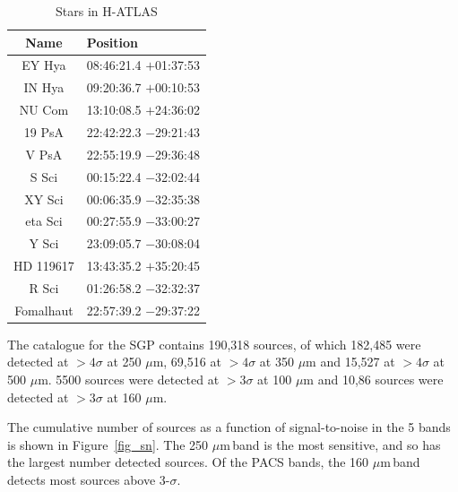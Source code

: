 \documentclass[useAMS,usenatbib]{mnras}
\def\mic{ $\mu $m\,}
\begin{document}
\begin{table}
\caption{Stars in H-ATLAS}
\begin{tabular}{cl}
\hline
Name & Position \\
\hline
EY Hya & 08:46:21.4 $+$01:37:53 \\
IN Hya & 09:20:36.7 $+$00:10:53 \\
NU Com & 13:10:08.5 $+$24:36:02 \\
19 PsA & 22:42:22.3 $-$29:21:43 \\
V PsA & 22:55:19.9  $-$29:36:48 \\
S Sci & 00:15:22.4 $-$32:02:44 \\
XY Sci & 00:06:35.9 $-$32:35:38 \\
eta Sci & 00:27:55.9 $-$33:00:27 \\
Y Sci & 23:09:05.7 $-$30:08:04 \\
HD 119617 & 13:43:35.2 $+$35:20:45 \\
R Sci & 01:26:58.2 $-$32:32:37 \\
Fomalhaut & 22:57:39.2 $-$29:37:22 \\
\hline
\end{tabular}
\end{table}

The catalogue for the SGP contains 190,318 sources, of which 182,485 were
detected at $>4\sigma$ at 250 $\mu$m, 69,516 at $>4\sigma$ at 350 $\mu$m
and 15,527 at $>4\sigma$ at 500 $\mu$m.  5500 sources were detected at
$>3\sigma$ at 100 $\mu$m and 10,86 sources were detected at $>3\sigma$
at 160 $\mu$m.

The cumulative number of sources as a function of signal-to-noise in
the 5 bands is shown in Figure~\ref{fig_sn}. The 250\mic band is
the most sensitive, and so has the largest number detected sources. Of
the PACS bands, the 160\mic band detects most sources above
3-$\sigma$.
\end{document}
